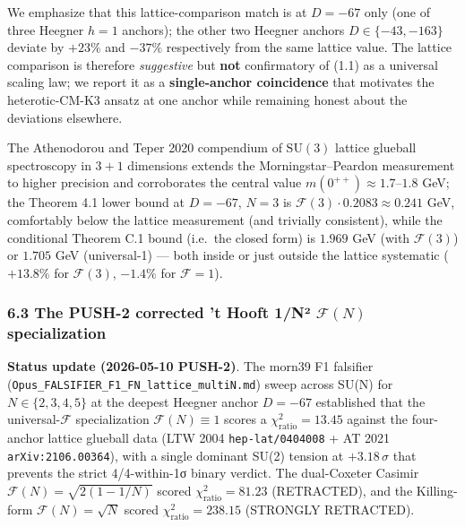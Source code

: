 \documentclass[
  11pt,
  a4paper,
]{amsart}
\begin{document}
We emphasize that this lattice-comparison match is at \(D = -67\) only (one of three Heegner \(h = 1\) anchors); the other two Heegner anchors \(D \in \{-43, -163\}\) deviate by \(+23 \%\) and \(-37 \%\) respectively from the same lattice value. The lattice comparison is therefore \emph{suggestive} but \textbf{not} confirmatory of (1.1) as a universal scaling law; we report it as a \textbf{single-anchor coincidence} that motivates the heterotic-CM-K3 ansatz at one anchor while remaining honest about the deviations elsewhere.

The Athenodorou and Teper 2020 compendium of \(\mathrm{SU}(3)\) lattice glueball spectroscopy in \(3+1\) dimensions extends the Morningstar--Peardon measurement to higher precision and corroborates the central value \(m(0^{++}) \approx 1.7\)--\(1.8\) GeV; the Theorem 4.1 lower bound at \(D = -67\), \(N = 3\) is \(\mathcal{F}(3) \cdot 0.2083 \approx 0.241\) GeV, comfortably below the lattice measurement (and trivially consistent), while the conditional Theorem C.1 bound (i.e.~the closed form) is \(1.969\) GeV (with \(\mathcal{F}(3)\)) or \(1.705\) GeV (universal-1) --- both inside or just outside the lattice systematic (\(+13.8 \%\) for \(\mathcal{F}(3)\), \(-1.4 \%\) for \(\mathcal{F}=1\)).

\hypertarget{the-push-2-corrected-t-hooft-1nuxb2-mathcalfn-specialization}{%
\subsubsection{\texorpdfstring{6.3 The PUSH-2 corrected 't Hooft 1/N² \(\mathcal{F}(N)\) specialization}{6.3 The PUSH-2 corrected 't Hooft 1/N² \textbackslash mathcal\{F\}(N) specialization}}\label{the-push-2-corrected-t-hooft-1nuxb2-mathcalfn-specialization}}

\textbf{Status update (2026-05-10 PUSH-2)}. The morn39 F1 falsifier (\texttt{Opus\_FALSIFIER\_F1\_FN\_lattice\_multiN.md}) sweep across SU(N) for \(N \in \{2, 3, 4, 5\}\) at the deepest Heegner anchor \(D = -67\) established that the universal-\(\mathcal{F}\) specialization \(\mathcal{F}(N) \equiv 1\) scores a \(\chi^2_{\mathrm{ratio}} = 13.45\) against the four-anchor lattice glueball data (LTW 2004 \texttt{hep-lat/0404008} + AT 2021 \texttt{arXiv:2106.00364}), with a single dominant SU(2) tension at \(+3.18\,\sigma\) that prevents the strict 4/4-within-1σ binary verdict. The dual-Coxeter Casimir \(\mathcal{F}(N) = \sqrt{2(1-1/N)}\) scored \(\chi^2_{\mathrm{ratio}} = 81.23\) (RETRACTED), and the Killing-form \(\mathcal{F}(N) = \sqrt{N}\) scored \(\chi^2_{\mathrm{ratio}} = 238.15\) (STRONGLY RETRACTED).
\end{document}
